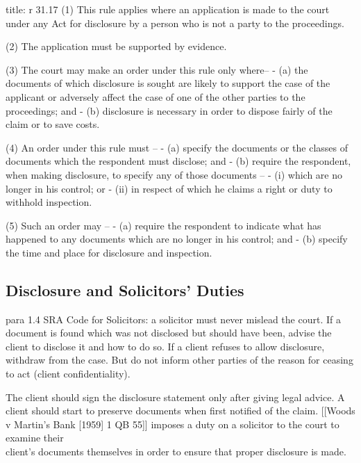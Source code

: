 \documentclass[
]{article}
\newenvironment{Shaded}{}{}
\newcommand{\NormalTok}[1]{#1}
\begin{document}
\begin{Shaded}
\begin{Highlighting}[]
\NormalTok{title: r 31.17}
\NormalTok{(1) This rule applies where an application is made to the court under any Act for disclosure by a person who is not a party to the proceedings.}

\NormalTok{(2) The application must be supported by evidence.}

\NormalTok{(3) The court may make an order under this rule only where–}
\NormalTok{{-} (a) the documents of which disclosure is sought are likely to support the case of the applicant or adversely affect the case of one of the other parties to the proceedings; and}
\NormalTok{{-} (b) disclosure is necessary in order to dispose fairly of the claim or to save costs.}

\NormalTok{(4) An order under this rule must –}
\NormalTok{{-} (a) specify the documents or the classes of documents which the respondent must disclose; and}
\NormalTok{{-} (b) require the respondent, when making disclosure, to specify any of those documents –}
\NormalTok{    {-} (i) which are no longer in his control; or}
\NormalTok{    {-} (ii) in respect of which he claims a right or duty to withhold inspection.}

\NormalTok{(5) Such an order may –}
\NormalTok{{-} (a) require the respondent to indicate what has happened to any documents which are no longer in his control; and}
\NormalTok{{-} (b) specify the time and place for disclosure and inspection.}
\end{Highlighting}
\end{Shaded}

\hypertarget{disclosure-and-solicitors-duties}{%
\subsection{Disclosure and Solicitors'
Duties}\label{disclosure-and-solicitors-duties}}

para 1.4 SRA Code for Solicitors: a solicitor must never mislead the
court. If a document is found which was not disclosed but should have
been, advise the client to disclose it and how to do so. If a client
refuses to allow disclosure, withdraw from the case. But do not inform
other parties of the reason for ceasing to act (client confidentiality).

The client should sign the disclosure statement only after giving legal
advice. A client should start to preserve documents when first notified
of the claim. {[}{[}Woods v Martin's Bank {[}1959{]} 1 QB 55{]}{]}
imposes a duty on a solicitor to the court to examine their\\
client's documents themselves in order to ensure that proper disclosure
is made.
\end{document}
